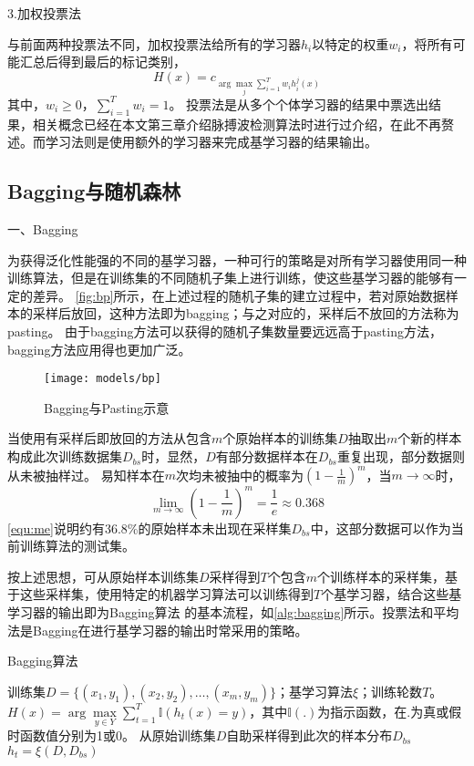 3.加权投票法

与前面两种投票法不同，加权投票法给所有的学习器$h_i$以特定的权重$w_i$，将所有可能汇总后得到最后的标记类别，
\begin{equation}
    \label{equ:wvoting}
    H(x)=c_{\arg \max\limits_{j} \sum_{i=1}^T{w_ih_i^j(x)}}
\end{equation}
其中，$w_i\ge0$，$\sum_{i=1}^T{w_i=1}$。
投票法是从多个个体学习器的结果中票选出结果，相关概念已经在本文第三章介绍脉搏波检测算法时进行过介绍，在此不再赘述。而学习法则是使用额外的学习器来完成基学习器的结果输出。

\subsection{Bagging与随机森林}
一、Bagging

为获得泛化性能强的不同的基学习器，一种可行的策略是对所有学习器使用同一种训练算法，但是在训练集的不同随机子集上进行训练，使这些基学习器的能够有一定的差异。
\autoref{fig:bp}所示，在上述过程的随机子集的建立过程中，若对原始数据样本的采样后放回，这种方法即为bagging；与之对应的，采样后不放回的方法称为pasting\cite{Aurélien2018,Zhou2016}。
由于bagging方法可以获得的随机子集数量要远远高于pasting方法，bagging方法应用得也更加广泛。
\begin{figure}[htbp]
    \centering
    \texttt{[image: models/bp]}
    \caption[Bagging与Pasting示意]{\label{fig:bp}Bagging与Pasting示意\cite{Aurélien2018}}
\end{figure}

当使用有采样后即放回的方法从包含$m$个原始样本的训练集$D$抽取出$m$个新的样本构成此次训练数据集$D_{bs}$时，显然，$D$有部分数据样本在$D_{bs}$重复出现，部分数据则从未被抽样过。
易知样本在$m$次均未被抽中的概率为$(1-\frac{1}{m})^m$，当$m \to \infty$时，
\begin{equation}
    \label{equ:me}
    \lim_{m \to \infty}{(1-\frac{1}{m})}^m = \frac{1}{e} \approx 0.368
\end{equation}
\autoref{equ:me}说明约有36.8\%的原始样本未出现在采样集$D_{bs}$中，这部分数据可以作为当前训练算法的测试集。

按上述思想，可从原始样本训练集$D$采样得到$T$个包含$m$个训练样本的采样集，基于这些采样集，使用特定的机器学习算法可以训练得到$T$个基学习器，结合这些基学习器的输出即为Bagging算法
的基本流程，如\autoref{alg:bagging}所示。投票法和平均法是Bagging在进行基学习器的输出时常采用的策略。
\begin{breakablealgorithm}
    \caption[Bagging算法]{Bagging算法\cite{Zhou2016}}
    \label{alg:bagging}
    \begin{algorithmic}[1] %
        \Require 训练集$D=\{(x_1,y_1),(x_2,y_2),\dots,(x_m,y_m)\}$；基学习算法$\xi$；训练轮数$T$。
        \Ensure $H(x)=\arg \max \limits_{y \in Y} \sum_{t=1}^T \mathbb{I}(h_t(x)=y)$，其中$\mathbb{I}(.)$为指示函数，在$.$为真或假时函数值分别为1或0。
            \State 从原始训练集$D$自助采样得到此次的样本分布$D_{bs}$
            \State $h_t=\xi (D,D_{bs})$
        \EndFor
    \end{algorithmic}
\end{breakablealgorithm}

